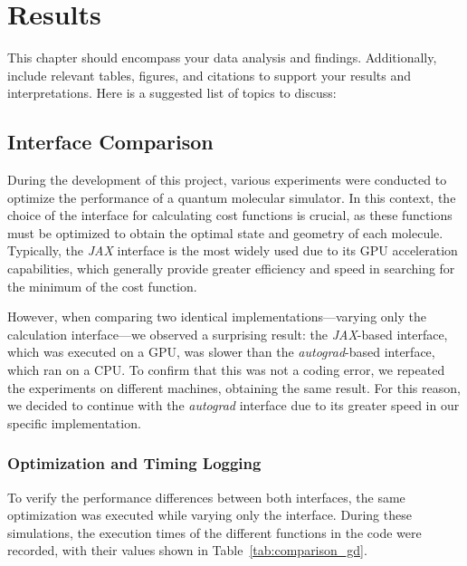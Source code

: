 \chapter{Results}
This chapter should encompass your data analysis and findings. Additionally, include relevant tables, figures, and citations to support your results and interpretations. Here is a suggested list of topics to discuss:
\section{Interface Comparison}
During the development of this project, various experiments were conducted to optimize the performance of a quantum molecular simulator. In this context, the choice of the interface for calculating cost functions is crucial, as these functions must be optimized to obtain the optimal state and geometry of each molecule. Typically, the \textit{JAX} interface is the most widely used due to its GPU acceleration capabilities, which generally provide greater efficiency and speed in searching for the minimum of the cost function.

However, when comparing two identical implementations—varying only the calculation interface—we observed a surprising result: the \textit{JAX}-based interface, which was executed on a GPU, was slower than the \textit{autograd}-based interface, which ran on a CPU. To confirm that this was not a coding error, we repeated the experiments on different machines, obtaining the same result. For this reason, we decided to continue with the \textit{autograd} interface due to its greater speed in our specific implementation.

\subsection{Optimization and Timing Logging}
To verify the performance differences between both interfaces, the same optimization was executed while varying only the interface. During these simulations, the execution times of the different functions in the code were recorded, with their values shown in Table~\ref{tab:comparison_gd}.


